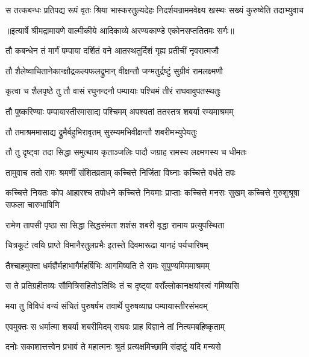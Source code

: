 \fourlineindentedshloka
{स तत्कबन्धः प्रतिपद्य रूपं}
{ वृतः श्रिया भास्करतुल्यदेहः}
{निदर्शयन्राममवेक्ष्य खस्थः}
{ सख्यं कुरुष्वेति तदाभ्युवाच} %


{॥इत्यार्षे श्रीमद्रामायणे वाल्मीकीये आदिकाव्ये अरण्यकाण्डे एकोनसप्ततितमः सर्गः॥}


\twolineshloka
{तौ कबन्धेन तं मार्गं पम्पाया दर्शितं वने}
{आतस्थतुर्दिशं गृह्य प्रतीचीं नृवरात्मजौ} %

\twolineshloka
{तौ शैलेष्वाचितानेकान्क्षौद्रकल्पफलद्रुमान्}
{वीक्षन्तौ जग्मतुर्द्रष्टुं सुग्रीवं रामलक्ष्मणौ} %

\twolineshloka
{कृत्वा च शैलपृष्ठे तु तौ वासं रघुनन्दनौ}
{पम्पायाः पश्चिमं तीरं राघवावुपतस्थतुः} %

\twolineshloka
{तौ पुष्करिण्याः पम्पायास्तीरमासाद्य पश्चिमम्}
{अपश्यतां ततस्तत्र शबर्या रम्यमाश्रमम्} %

\twolineshloka
{तौ तमाश्रममासाद्य द्रुमैर्बहुभिरावृतम्}
{सुरम्यमभिवीक्षन्तौ शबरीमभ्युपेयतुः} %

\twolineshloka
{तौ तु दृष्ट्वा तदा सिद्धा समुत्थाय कृताञ्जलिः}
{पादौ जग्राह रामस्य लक्ष्मणस्य च धीमतः} %

\twolineshloka
{तामुवाच ततो रामः श्रमणीं संशितव्रताम्}
{कच्चित्ते निर्जिता विघ्नाः कच्चित्ते वर्धते तपः} %

\threelineshloka
{कच्चित्ते नियतः कोप आहारश्च तपोधने}
{कच्चित्ते नियमाः प्राप्ताः कच्चित्ते मनसः सुखम्}
{कच्चित्ते गुरुशुश्रूषा सफला चारुभाषिणि} %

\twolineshloka
{रामेण तापसी पृष्ठा सा सिद्धा सिद्धसंमता}
{शशंस शबरी वृद्धा रामाय प्रत्युपस्थिता} %

\twolineshloka
{चित्रकूटं त्वयि प्राप्ते विमानैरतुलप्रभैः}
{इतस्ते दिवमारूढा यानहं पर्यचारिषम्} %

\twolineshloka
{तैश्चाहमुक्ता धर्मज्ञैर्महाभागैर्महर्षिभिः}
{आगमिष्यति ते रामः सुपुण्यमिममाश्रमम्} %

\twolineshloka
{स ते प्रतिग्रहीतव्यः सौमित्रिसहितोऽतिथिः}
{तं च दृष्ट्वा वराँल्लोकानक्षयांस्त्वं गमिष्यसि} %

\twolineshloka
{मया तु विविधं वन्यं संचितं पुरुषर्षभ}
{तवार्थे पुरुषव्याघ्र पम्पायास्तीरसंभवम्} %

\twolineshloka
{एवमुक्तः स धर्मात्मा शबर्या शबरीमिदम्}
{राघवः प्राह विज्ञाने तां नित्यमबहिष्कृताम्} %

\twolineshloka
{दनोः सकाशात्तत्त्वेन प्रभावं ते महात्मनः}
{श्रुतं प्रत्यक्षमिच्छामि संद्रष्टुं यदि मन्यसे} %

